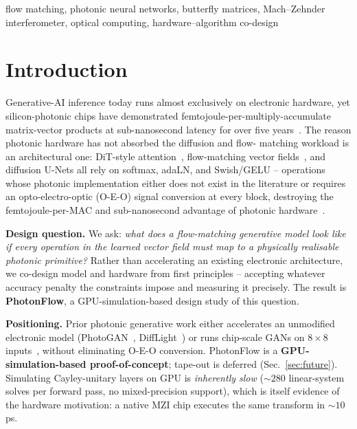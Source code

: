 \documentclass[conference]{IEEEtran}
\begin{document}
\begin{IEEEkeywords}
flow matching, photonic neural networks, butterfly matrices,
Mach--Zehnder interferometer, optical computing, hardware--algorithm co-design
\end{IEEEkeywords}

\section{Introduction}

Generative-AI inference today runs almost exclusively on electronic
hardware, yet silicon-photonic chips have demonstrated
femtojoule-per-multiply-accumulate matrix-vector products at
sub-nanosecond latency for over five years~\cite{shen2017,ning2024}.
The reason photonic hardware has not absorbed the diffusion and flow-
matching workload is an architectural one: DiT-style
attention~\cite{peebles2023}, flow-matching vector
fields~\cite{lipman2023}, and diffusion U-Nets all rely on softmax,
adaLN, and Swish/GELU -- operations whose photonic implementation
either does not exist in the literature or requires an
opto-electro-optic (O-E-O) signal conversion at every block,
destroying the femtojoule-per-MAC and sub-nanosecond advantage of
photonic hardware~\cite{ning2024}.

\textbf{Design question.}
We ask: \emph{what does a flow-matching generative model look like
if every operation in the learned vector field must map to a
physically realisable photonic primitive?}  Rather than accelerating
an existing electronic architecture, we co-design model and hardware
from first principles -- accepting whatever accuracy penalty the
constraints impose and measuring it precisely.  The result is
\textbf{PhotonFlow}, a GPU-simulation-based design study of this
question.

\textbf{Positioning.}
Prior photonic generative work either accelerates an unmodified
electronic model (PhotoGAN~\cite{photogan2025},
DiffLight~\cite{suresh2026diffusion}) or runs chip-scale GANs on
$8{\times}8$ inputs~\cite{zhu2026}, without eliminating O-E-O
conversion.  PhotonFlow is a \textbf{GPU-simulation-based
proof-of-concept}; tape-out is deferred (Sec.~\ref{sec:future}).
Simulating Cayley-unitary layers on GPU is \emph{inherently slow}
(${\sim}280$ linear-system solves per forward pass, no
mixed-precision support), which is itself evidence of the hardware
motivation: a native MZI chip executes the same transform in
${\sim}10$\,ps.
\end{document}
